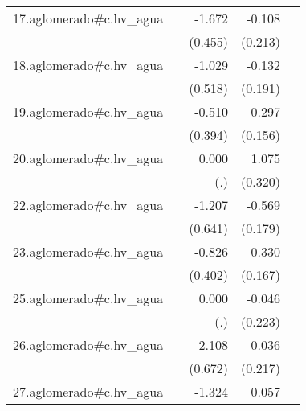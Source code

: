 {\begin{longtable}{l*{4}{D{.}{.}{-1}}}
\addlinespace
17.aglomerado#c.hv\_agua&                     &      -1.672\sym{***}&      -0.108         &                     \\
            &                     &     (0.455)         &     (0.213)         &                     \\
\addlinespace
18.aglomerado#c.hv\_agua&                     &      -1.029\sym{*}  &      -0.132         &                     \\
            &                     &     (0.518)         &     (0.191)         &                     \\
\addlinespace
19.aglomerado#c.hv\_agua&                     &      -0.510         &       0.297         &                     \\
            &                     &     (0.394)         &     (0.156)         &                     \\
\addlinespace
20.aglomerado#c.hv\_agua&                     &       0.000         &       1.075\sym{***}&                     \\
            &                     &         (.)         &     (0.320)         &                     \\
\addlinespace
22.aglomerado#c.hv\_agua&                     &      -1.207         &      -0.569\sym{**} &                     \\
            &                     &     (0.641)         &     (0.179)         &                     \\
\addlinespace
23.aglomerado#c.hv\_agua&                     &      -0.826\sym{*}  &       0.330\sym{*}  &                     \\
            &                     &     (0.402)         &     (0.167)         &                     \\
\addlinespace
25.aglomerado#c.hv\_agua&                     &       0.000         &      -0.046         &                     \\
            &                     &         (.)         &     (0.223)         &                     \\
\addlinespace
26.aglomerado#c.hv\_agua&                     &      -2.108\sym{**} &      -0.036         &                     \\
            &                     &     (0.672)         &     (0.217)         &                     \\
\addlinespace
27.aglomerado#c.hv\_agua&                     &      -1.324\sym{**} &       0.057         &                     \\

\end{longtable}}
